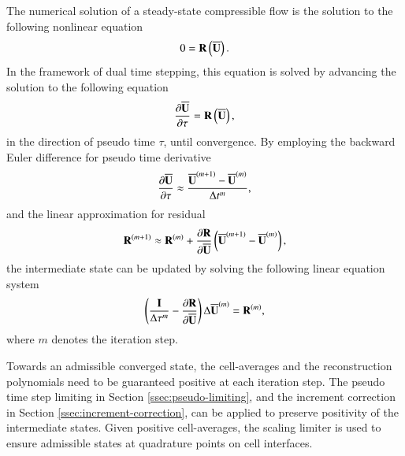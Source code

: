 The numerical solution of a steady-state compressible flow is the solution to the following nonlinear equation
\begin{equation}
    0 = \mathbf{R} \left(\overline{\mathbf{U}}\right).
\end{equation}
In the framework of dual time stepping, this equation is solved by advancing the solution to the following equation
\begin{equation}
    \dfrac{\partial \overline{\mathbf{U}}}{\partial \tau} = \mathbf{R} \left(\overline{\mathbf{U}}\right),
\end{equation}
in the direction of pseudo time $\tau$, until convergence. By employing the backward Euler difference for pseudo time derivative
\begin{equation}
    \dfrac{\partial \overline{\mathbf{U}}}{\partial \tau} \approx \dfrac{\overline{\mathbf{U}}^{(m+1)}-\overline{\mathbf{U}}^{(m)}}{\mathrm\Delta t^m},
\end{equation}
and the linear approximation for residual
\begin{equation}
    \mathbf{R}^{(m+1)} \approx \mathbf{R}^{(m)} + \dfrac{\partial \mathbf{R}}{\partial \overline{\mathbf{U}}} \left(\overline{\mathbf{U}}^{(m+1)}-\overline{\mathbf{U}}^{(m)}\right),
\end{equation}
the intermediate state can be updated by solving the following linear equation system
\begin{equation}
    \left(\frac{\eye}{\inc \tau^m} -\partialderivative{\R }{\uu} \right) \inc \uu^{\left(m\right)}
    = \R^{\left(m\right)},
\end{equation}
where $m$ denotes the iteration step. 

Towards an admissible converged state, the cell-averages and the reconstruction polynomials need to be guaranteed positive at each iteration step. The pseudo time step limiting in Section \ref{ssec:pseudo-limiting}, and the increment correction in Section \ref{ssec:increment-correction}, can be applied to preserve positivity of the intermediate states. Given positive cell-averages, the scaling limiter is used to ensure admissible states at quadrature points on cell interfaces. 
